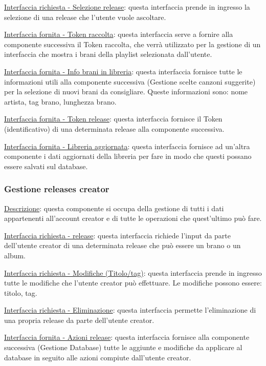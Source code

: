 \documentclass[a4paper,12pt]{article}
\begin{document}
\underline{Interfaccia richiesta - Selezione release}: questa interfaccia prende in ingresso la selezione di una release che l’utente vuole ascoltare.

\underline{Interfaccia fornita - Token raccolta}: questa interfaccia serve a fornire alla componente successiva il Token raccolta, che verrà utilizzato per la gestione di un interfaccia che mostra i brani della playlist selezionata dall’utente.

\underline{Interfaccia fornita - Info brani in libreria}: questa interfaccia fornisce tutte le informazioni utili alla componente successiva (Gestione scelte canzoni suggerite) per la selezione di nuovi brani da consigliare. Queste informazioni sono: nome artista, tag brano, lunghezza brano.

\underline{Interfaccia fornita - Token release}: questa interfaccia fornisce il Token (identificativo) di una determinata release alla componente successiva.

\underline{Interfaccia fornita - Libreria aggiornata}: questa interfaccia fornisce ad un'altra componente i dati aggiornati della libreria per fare in modo che questi possano essere salvati sul database.

\subsubsection{Gestione releases creator}

\underline{Descrizione}: questa componente si occupa della gestione di tutti i dati appartenenti all’account creator e di tutte le operazioni che quest’ultimo può fare.

\underline{Interfaccia richiesta - release}: questa interfaccia richiede l’input da parte dell’utente creator di una determinata release che può essere un brano o un album. 

\underline{Interfaccia richiesta - Modifiche (Titolo/tag)}: questa interfaccia prende in ingresso tutte le modifiche che l’utente creator può effettuare. Le modifiche possono essere: titolo, tag.

\underline{Interfaccia richiesta - Eliminazione}: questa interfaccia permette l’eliminazione di una propria release da parte dell’utente creator.

\underline{Interfaccia fornita - Azioni release}: questa interfaccia fornisce alla componente successiva (Gestione Database) tutte le aggiunte e modifiche da applicare al database in seguito alle azioni compiute dall’utente creator.
\end{document}
